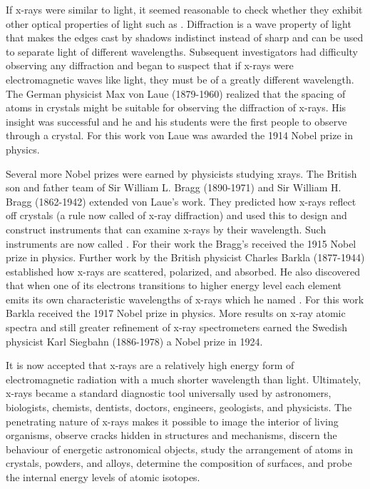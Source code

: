 \noindent If x-rays were similar to light, it seemed reasonable to check whether they exhibit other optical properties of light such as . Diffraction is a wave property of light that makes the edges cast by shadows indistinct instead of sharp and can be used to separate light of different wavelengths. Subsequent investigators had difficulty observing any diffraction and began to suspect that if x-rays were electromagnetic waves like light, they must be of a greatly different wavelength. The German physicist Max von Laue (1879-1960) realized that the spacing of atoms in crystals might be suitable for observing the diffraction of x-rays. His insight was successful and he and his students were the first people to observe  through a crystal. For this work von Laue was awarded the 1914 Nobel prize in physics.

\noindent Several more Nobel prizes were earned by physicists studying xrays. The British son and father team of Sir William L. Bragg (1890-1971) and Sir William H. Bragg (1862-1942) extended von Laue’s work. They predicted how x-rays reflect off crystals (a rule now called  of x-ray diffraction) and used this to design and construct instruments that can examine x-rays by their wavelength. Such instruments are now called . For their work the Bragg’s received the 1915 Nobel prize in physics. Further work by the British physicist Charles Barkla (1877-1944) established how x-rays are scattered, polarized, and absorbed. He also discovered that when one of its electrons transitions to higher energy level each element emits its own characteristic wavelengths of x-rays which he named . For this work Barkla received the 1917 Nobel prize in physics. More results on x-ray atomic spectra and still greater refinement of x-ray spectrometers earned the Swedish physicist Karl Siegbahn (1886-1978) a Nobel prize in 1924.


\noindent It is now accepted that x-rays are a relatively high energy form of electromagnetic radiation with a much shorter wavelength than light. Ultimately, x-rays became a standard diagnostic tool universally used by astronomers, biologists, chemists, dentists, doctors, engineers, geologists, and physicists. The penetrating nature of x-rays makes it possible to image the interior of living organisms, observe cracks hidden in structures and mechanisms, discern the behaviour of energetic astronomical objects, study the arrangement of atoms in crystals, powders, and alloys, determine the composition of surfaces, and probe the internal energy levels of atomic isotopes.

